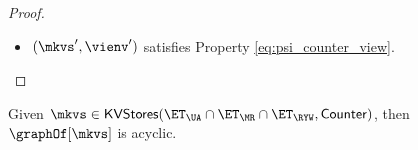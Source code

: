 \begin{proof}
\begin{itemize}
\begin{itemize}
\begin{itemize}
\item $\txid' \in \txidset'_{i}$. We need to distinguish the cases $i \neq m$, leading to $\txidset'_{i} = \txidset_{i}$, 
or $i = m$, in which case $\txidset'_{i} = \txidset'_{m} = \txidset_{m} \cup \{\txid\}$. If either $i \neq m$, or $i = m$ and $\txid \in 
\txidset_{m}$, then we can proceed as in the case $\txid' = \txid_{i}$. Otherwise, suppose that $i = m$ and 
$\txid' = \txid$. Then, because $\txid' \toEDGE{\SO} \txid''$, and $\txid \in \nextTxid(\mkvs,\cl)$, 
it must be the case that $\txid = \txid_{\cl}^{p}$ for some $p \geq 0$, and whenever 
$\txid_{\cl}^{\cdot} \in \key$, then $\txid_{\cl}^{\cdot} \toEDGE{\SO} \txid$. In particular 
we cannot have that $\txid'' \in \key$, because $\txid \toEDGE{\SO} \txid''$, which 
concludes the proof.
\end{itemize}

\item $(\mkvs', \vienv')$ satisfies Property \eqref{eq:psi_counter_view}.

\end{itemize}

\end{itemize}

\end{proof}

\begin{corollary}
\label{cor:psi_counter_acyclic}
Given $\mkvs \in \mathsf{KVStores}(\ET_{\UA} \cap \ET_{\MR} \cap \ET_{\RYW}, \mathsf{Counter})$, 
then $\graphOf[\mkvs]$ is acyclic.
\end{corollary}

